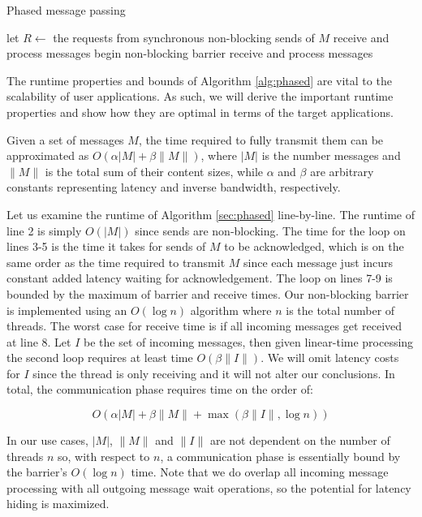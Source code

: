\documentclass[final,1p,times]{elsarticle}
\begin{document}
\begin{algorithm}
\caption{Phased message passing}
\label{alg:phased}
\begin{algorithmic}[1]
\State let $R \gets$ the requests from synchronous non-blocking sends of $M$
\State receive and process messages
\EndWhile
\State begin non-blocking barrier
\State receive and process messages
\EndWhile
\EndFunction
\end{algorithmic}
\end{algorithm}

The runtime properties and bounds of Algorithm \ref{alg:phased} are vital
to the scalability of user applications.
As such, we will derive the important runtime properties and show how
they are optimal in terms of the target applications.

Given a set of messages $M$, the time required to fully transmit them
can be approximated as $O(\alpha|M| + \beta\|M\|)$, where
$|M|$ is the number messages and $\|M\|$ is the total sum of their
content sizes, while $\alpha$ and $\beta$ are arbitrary constants
representing latency and inverse bandwidth, respectively.

Let us examine the runtime of Algorithm \ref{sec:phased} line-by-line.
The runtime of line 2 is simply $O(|M|)$ since sends are non-blocking.
The time for the loop on lines 3-5 is the time it takes
for sends of $M$ to be acknowledged, which is on the same order
as the time required to transmit $M$ since each message just incurs
constant added latency waiting for acknowledgement.
The loop on lines 7-9 is bounded by the maximum of barrier and receive times.
Our non-blocking barrier is implemented using an $O(\log n)$ algorithm where
$n$ is the total number of threads.
The worst case for receive time is if all incoming messages get received at
line 8.
Let $I$ be the set of incoming messages, then given linear-time processing
the second loop requires at least time $O(\beta\|I\|)$.
We will omit latency costs for $I$ since the thread is only receiving
and it will not alter our conclusions.
In total, the communication phase requires time on the order of:

\[O(\alpha|M| + \beta\|M\| + \max(\beta\|I\|,\log n))\]

In our use cases, $|M|$, $\|M\|$ and $\|I\|$ are
not dependent on the number of threads $n$ so, with respect to $n$,
a communication phase is essentially bound by the barrier's $O(\log n)$ time.
Note that we do overlap all incoming message processing with all outgoing
message wait operations, so the potential for latency hiding is maximized.
\end{document}
